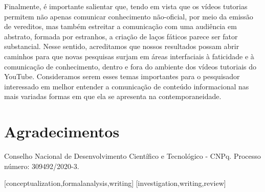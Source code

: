 \documentclass[portuguese]{textolivre}
\begin{document}
Finalmente, é importante salientar que, tendo em vista que os vídeos tutorias permitem não apenas comunicar conhecimento não-oficial, por meio da emissão de vereditos, mas também estreitar a comunicação com uma audiência em abstrato, formada por estranhos, a criação de laços fáticos parece ser fator substancial. Nesse sentido, acreditamos que nossos resultados possam abrir caminhos para que novas pesquisas surjam em áreas interfaciais à faticidade e à comunicação de conhecimento, dentro e fora do ambiente dos vídeos tutoriais do YouTube. Consideramos serem esses temas importantes para o pesquisador interessado em melhor entender a comunicação de conteúdo informacional nas mais variadas formas em que ela se apresenta na contemporaneidade.

\section{Agradecimentos}
Conselho Nacional de Desenvolvimento Científico e Tecnológico - CNPq. Processo número: 309492/2020-3.

\printbibliography\label{sec-bib}


\begin{contributors}
[conceptualization,formalanalysis,writing]
[investigation,writing,review]
\end{contributors}
\end{document}
